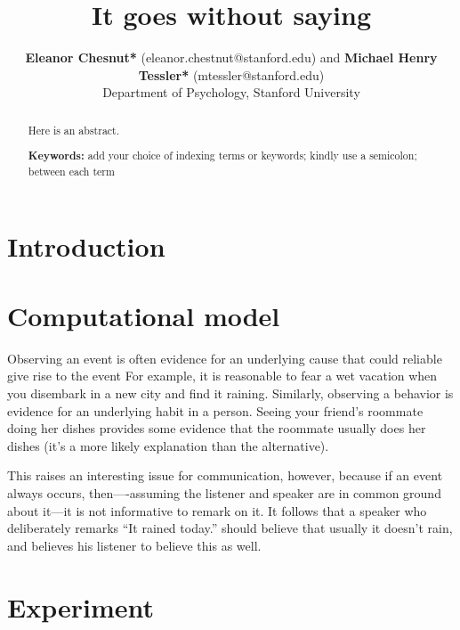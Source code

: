 \documentclass[10pt,letterpaper]{article}
\title{It goes without saying}
\author{{\large \bf Eleanor Chesnut*} (eleanor.chestnut@stanford.edu) and {\large \bf Michael Henry Tessler*} (mtessler@stanford.edu) \\
  Department of Psychology, Stanford University}
\begin{document}
\maketitle


\begin{abstract}
Here is an abstract.

\textbf{Keywords:} 
add your choice of indexing terms or keywords; kindly use a
semicolon; between each term

\end{abstract}

\section{Introduction}

\section{Computational model}

Observing an event is often evidence for an underlying cause that could reliable give rise to the event
For example, it is reasonable to fear a wet vacation when you disembark in a new city and find it raining. 
Similarly, observing a behavior is evidence for an underlying habit in a person. 
Seeing your friend's roommate doing her dishes provides some evidence that the roommate usually does her dishes (it's a more likely explanation than the alternative). 

This raises an interesting issue for communication, however, because if an event always occurs, then----assuming the listener and speaker are in common ground about it---it is not informative to remark on it. 
It follows that a speaker who deliberately remarks ``It rained today.'' should believe that usually it doesn't rain, and believes his listener to believe this as well. 



\section{Experiment}




\setlength{\bibleftmargin}{.125in}
\setlength{\bibindent}{-\bibleftmargin}


\end{document}
